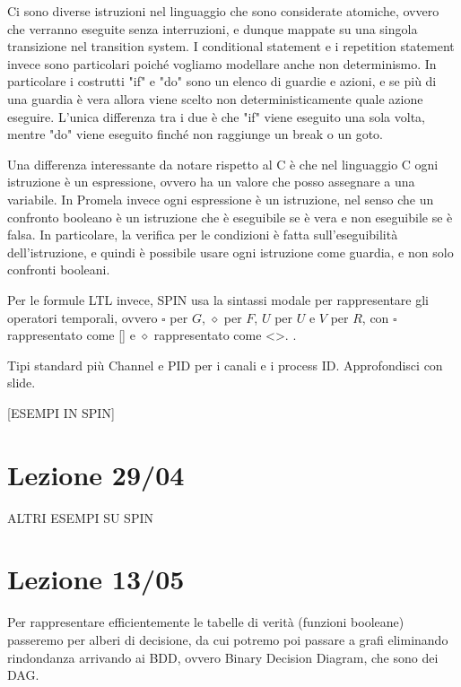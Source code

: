 
Ci sono diverse istruzioni nel linguaggio che sono considerate atomiche, ovvero che verranno eseguite senza interruzioni, e dunque mappate su una singola transizione nel transition system. I conditional statement e i repetition statement invece sono particolari poiché vogliamo modellare anche non determinismo. In particolare i costrutti "if" e "do" sono un elenco di guardie e azioni, e se più di una guardia è vera allora viene scelto non deterministicamente quale azione eseguire. L'unica differenza tra i due è che "if" viene eseguito una sola volta, mentre "do" viene eseguito finché non raggiunge un break o un goto.


Una differenza interessante da notare rispetto al C è che nel linguaggio C ogni istruzione è un espressione, ovvero ha un valore che posso assegnare a una variabile. In Promela invece ogni espressione è un istruzione, nel senso che un confronto booleano è un istruzione che è eseguibile se è vera e non eseguibile se è falsa. In particolare, la verifica per le condizioni è fatta sull'eseguibilità dell'istruzione, e quindi è possibile usare ogni istruzione come guardia, e non solo confronti booleani.

Per le formule LTL invece, SPIN usa la sintassi modale per rappresentare gli operatori temporali, ovvero \(\square\) per \(G\), \(\diamond\) per \(F\), \(U\) per \(U\) e \(V\) per \(R\), con \(\square\) rappresentato come [] e \(\diamond\) rappresentato come <>. .

Tipi standard più Channel e PID per i canali e i process ID. Approfondisci con slide.

  [ESEMPI IN SPIN]

\chapter{Lezione 29/04}

ALTRI ESEMPI SU SPIN\@

\chapter{Lezione 13/05}

Per rappresentare efficientemente le tabelle di verità (funzioni booleane) passeremo per alberi di decisione, da cui potremo poi passare a grafi eliminando rindondanza arrivando ai BDD, ovvero Binary Decision Diagram, che sono dei DAG\@.

